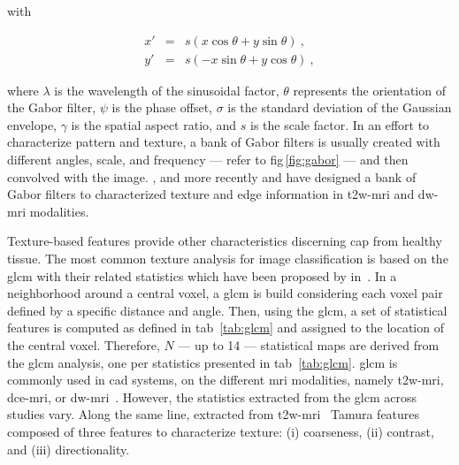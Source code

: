 \noindent with 

\begin{eqnarray}
	x' & = & s\left( x \cos \theta + y \sin \theta \right) \ , \nonumber \\
	y' & = & s \left( - x \sin \theta + y \cos \theta \right) \ , \nonumber
\end{eqnarray}

\noindent where $\lambda$ is the wavelength of the sinusoidal factor, $\theta$ represents the orientation of the Gabor filter, $\psi$ is the phase offset, $\sigma$ is the standard deviation of the Gaussian envelope, $\gamma$ is the spatial aspect ratio, and $s$ is the scale factor.
In an effort to characterize pattern and texture, a bank of Gabor filters is usually created with different angles, scale, and frequency --- refer to \acs{fig}\,\ref{fig:gabor} --- and then convolved with the image.
\citeauthor{Viswanath2012}, \citeauthor{Tiwari2012} and more recently \citeauthor{khalvati2015automated} and \citeauthor{chung2015prostate} have designed a bank of Gabor filters to characterized texture and edge information in \ac{t2w}-\ac{mri} and \ac{dw}-\ac{mri} modalities.

Texture-based features provide other characteristics discerning \ac{cap} from healthy tissue.
The most common texture analysis for image classification is based on the \ac{glcm} with their related statistics which have been proposed by \citeauthor{Haralick1973} in~\cite{Haralick1973}.
In a neighborhood around a central voxel, a \ac{glcm} is build considering each voxel pair defined by a specific distance and angle.
Then, using the \ac{glcm}, a set of statistical features is computed as defined in \acs{tab}~\ref{tab:glcm} and assigned to the location of the central voxel.
Therefore, $N$ --- up to 14 --- statistical maps are derived from the \ac{glcm} analysis, one per statistics presented in \acs{tab}~\ref{tab:glcm}.
\ac{glcm} is commonly used in \ac{cad} systems, on the different \ac{mri} modalities, namely \ac{t2w}-\ac{mri}, \ac{dce}-\ac{mri}, or \ac{dw}-\ac{mri}~\cite{Antic2013,Niaf2011,Niaf2012,Tiwari2009a,Tiwari2010,Tiwari2013,Viswanath2008,Viswanath2009,Viswanath2011,Viswanath2012,trigui2016classification,rampun2015computer,rampun2016computer,rampun2016quantitative,cameron2014multiparametric,cameron2016maps,khalvati2015automated,chung2015prostate,lehaire2014computer}.
However, the statistics extracted from the \ac{glcm} across studies vary.
Along the same line, \citeauthor{rampun2016computer} extracted from \ac{t2w}-\ac{mri}~\cite{rampun2016computer,rampun2015computer} Tamura features~\cite{tamura1978textural} composed of three features to characterize texture: (i) coarseness, (ii) contrast, and (iii) directionality.


